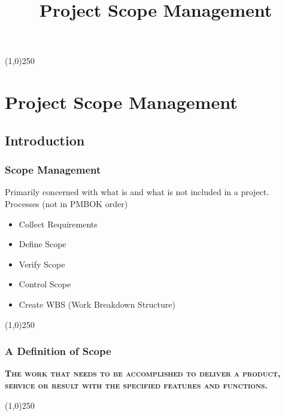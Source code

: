 



\title[Project Management]{Project Scope Management}
%


%

\tableofcontents
\newpage



\begin{frame}
\titlepage
\end{frame}\begin{center}\line(1,0){250}\end{center}
%
%


\section{Project Scope Management}

\subsection{Introduction}



\begin{frame}
\frametitle{Scope Management}
Primarily concerned with what is and what is not included in a project.\\
Processes (not in PMBOK order)
\begin{itemize}
 	\item Collect Requirements
 	\item Define Scope
 	\item Verify Scope
 	\item Control Scope
 	\item Create WBS (Work Breakdown Structure)
\end{itemize}
\end{frame}\begin{center}\line(1,0){250}\end{center}



\begin{frame}
\frametitle{A Definition of Scope}
\textbf{\textsc{The work that needs to be accomplished to deliver a product, service or result with the specified features and functions.}}
\end{frame}\begin{center}\line(1,0){250}\end{center}



